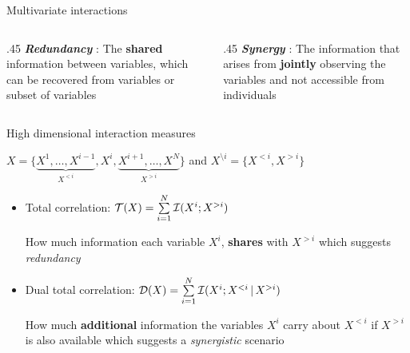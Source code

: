 \documentclass{beamer}
\begin{document}
\begin{frame}{Multivariate interactions}
\begin{columns}
\begin{column}{.45\textwidth}
\textit{\textbf{Redundancy }}: The \textbf{shared} information between variables, which can be recovered from variables or subset of variables
\newline
\end{column}
\begin{column}{.45\textwidth}
\textit{\textbf{Synergy }}: The information that arises from \textbf{jointly} observing the variables and not accessible from individuals
\newline
\end{column}
\end{columns}
\begin{figure}
    \centering
    
\end{figure}
\end{frame}





\begin{frame}{High dimensional interaction measures}

$X = \{ \underbrace{ X^1,\dots,X^{i-1}}_{X^{<i} } ,X^i,\underbrace{X^{i+1},\dots,X^N}_{X^{>i}}  \} $ and $X^{\setminus i}=\{X^{<i},X^{>i}\}$



\begin{itemize}
\item Total correlation: $\mathcal{T}(X) = \sum\limits_{i=1}^{N} \mathcal{I}(X^i;X^{>i})$ 
    
    How much information each variable $X^i$, \textbf{shares} with $X^{>i}$ which suggests \textit{redundancy} 
    
\item Dual total correlation: $\mathcal{D}( X) = \sum\limits_{i=1}^{N}   \mathcal{I}(X^i;X^{<i} \,|\, X^{>i})$

How much \textbf{additional} information the variables $X^i$ carry about $X^{<i}$ if  $ X^{>i}$ is also available which suggests a \textit{synergistic} scenario



\end{itemize}
\end{frame}
\end{document}
